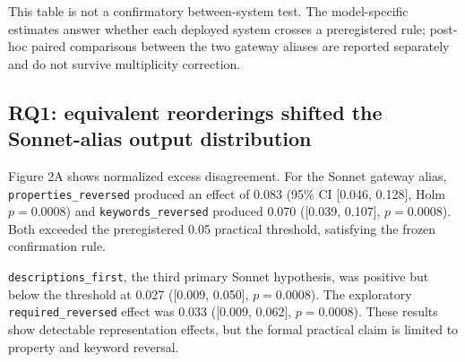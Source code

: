 \documentclass[10pt]{article}
\begin{document}
\begin{table}[t]
\caption{Decomposed follow-up and official-endpoint replication.}
\label{tab:markdown-2}
\centering
{}
\end{table}
This table is not a confirmatory between-system test. The model-specific estimates answer whether each deployed system crosses a preregistered rule; post-hoc paired comparisons between the two gateway aliases are reported separately and do not survive multiplicity correction.

\subsection{RQ1: equivalent reorderings shifted the Sonnet-alias output distribution}
Figure 2A shows normalized excess disagreement. For the Sonnet gateway alias, \texttt{properties\_reversed} produced an effect of 0.083 (95\% CI [0.046, 0.128], Holm \(p=0.0008\)) and \texttt{keywords\_reversed} produced 0.070 ([0.039, 0.107], \(p=0.0008\)). Both exceeded the preregistered 0.05 practical threshold, satisfying the frozen confirmation rule.

\texttt{descriptions\_first}, the third primary Sonnet hypothesis, was positive but below the threshold at 0.027 ([0.009, 0.050], \(p=0.0008\)). The exploratory \texttt{required\_reversed} effect was 0.033 ([0.009, 0.062], \(p=0.0008\)). These results show detectable representation effects, but the formal practical claim is limited to property and keyword reversal.
\end{document}
